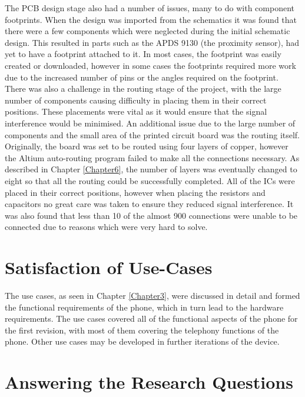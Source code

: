 	The PCB design stage also had a number of issues, many to do with component footprints. 
When the design was imported from the schematics it was found that there were a few components which were neglected during the initial schematic design. This resulted in parts such as the APDS 9130 (the proximity sensor), had yet to have a footprint attached to it. 
In most cases, the footprint was easily created or downloaded, however in some cases the footprints required more work due to the increased number of pins or the angles required on the footprint. 
There was also a challenge in the routing stage of the project, with the large number of components causing difficulty in placing them in their correct positions. These placements were vital as it would ensure that the signal interference would be minimised. 
An additional issue due to the large number of components and the small area of the printed circuit board was the routing itself. 
Originally, the board was set to be routed using four layers of copper, however the Altium auto-routing program failed to make all the connections necessary.
As described in Chapter \ref{Chapter6}, the number of layers was eventually changed to eight so that all the routing could be successfully completed. 
All of the ICs were placed in their correct positions, however when placing the resistors and capacitors no great care was taken to ensure they reduced signal interference. 
It was also found that less than 10 of the almost 900 connections were unable to be connected due to reasons which were very hard to solve.\\


\section{Satisfaction of Use-Cases}
\label{chap7sec2}

	The use cases, as seen in Chapter \ref{Chapter3}, were discussed in detail and formed the functional requirements of the phone, which in turn lead to the hardware requirements. 
The use cases covered all of the functional aspects of the phone for the first revision, with most of them covering the telephony functions of the phone.
Other use cases may be developed in further iterations of the device. 

\section{Answering the Research Questions}
\label{chap7sec3}


